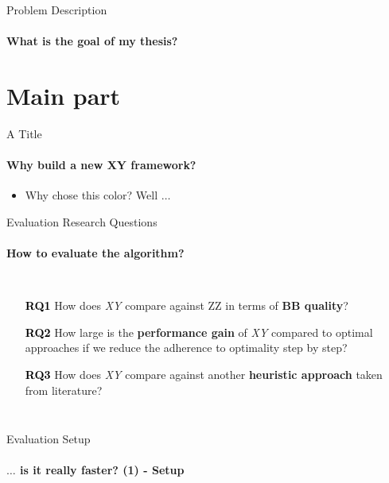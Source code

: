 \documentclass[
	english,%
	aspectratio=169,%
	accentcolor=1b,
	logo=true,%
	colorframetitle=true,%
	authorontitle=true,
	usepdftitle=false,
	design=2008,
	]{tudabeamer}
\begin{document}
\begin{frame}{Problem Description}
	\framesubtitle{What is the goal of my thesis?}
	\label{goal}
\end{frame}

%
%

\section{Main part}

\begin{frame}{A Title}
	\framesubtitle{Why build a new XY framework?}
	\label{framework}
	
	\begin{itemize}
		\item \textcolor{TUDa-0c}{Why chose this color? Well $\ldots$}
	\end{itemize}
\end{frame}

\begin{frame}{Evaluation Research Questions}
	\framesubtitle{How to evaluate the algorithm?}
	\label{eval-research-questions}
	
	\vspace{3.5em}

	\begin{columns}[onlytextwidth,c]
	
		\begin{itemize}
			\itemsep1.5em
			\item[\textcolor{black}{\textbf{RQ1}}] How does \textit{XY} compare against ZZ in terms of \textbf{BB quality}?
	
			\item[\textcolor{black}{\textbf{RQ2}}] How large is the \textbf{performance gain} of \textit{XY} compared to optimal approaches if we reduce the adherence to optimality step by step?
			
			\item[\textcolor{black}{\textbf{RQ3}}] How does \textit{XY} compare against another \textbf{heuristic approach} taken from literature?
		\end{itemize}

	\end{columns}
	
\end{frame}

\begin{frame}{Evaluation Setup}
	\framesubtitle{$\ldots$ is it really faster? (1) - Setup}
	\label{results-setup}
	
\end{frame}
\end{document}
